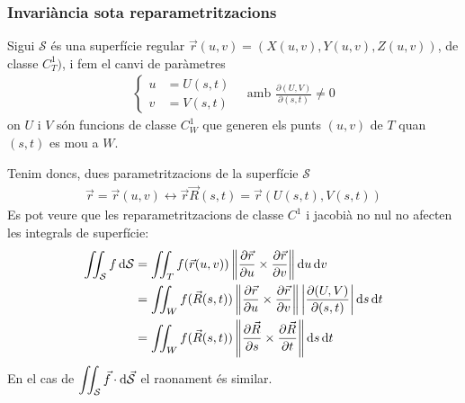 \subsubsection*{Invariància sota reparametritzacions}
Sigui $\mathcal{S}$ és una superfície regular $\vec{r}(u,v) = (X(u,v), Y(u,v), Z(u,v))$, de classe $C^{1}_{T})$, i fem el canvi de paràmetres
\begin{align*}
	\begin{cases} u & = U(s,t) \\ v & = V(s,t) \end{cases} \quad \text{amb } \frac{\partial (U,V)}{\partial (s,t)} \neq 0
\end{align*}
on $U$ i $V$ són funcions de classe $C^{1}_{W}$ que generen els punts $(u,v)$ de $T$ quan $(s,t)$ es mou a $W$.

Tenim doncs, dues parametritzacions de la superfície $\mathcal{S}$
\begin{align*}
	\vec{r} = \vec{r}(u,v) \leftrightarrow \vec{r} \vec{R}(s,t) = \vec{r}( U(s,t), V(s,t))
\end{align*}
Es pot veure que les reparametritzacions de classe $C^{1}$ i jacobià no nul no afecten les integrals de superfície:
\begin{align}
\begin{aligned}
	\iint_{\mathcal{S}} f \mathop{}\!\mathrm{d} \mathcal{S} & = \iint_{T} f(\vec{r}(u,v)) \left\| \frac{\partial \vec{r}}{\partial u} \times \frac{\partial \vec{r}}{\partial v} \right\| \mathop{}\!\mathrm{d} u \mathop{}\!\mathrm{d} v \\
	& = \iint_{W} f(\vec{R}(s,t)) \left\| \frac{\partial \vec{r}}{\partial u} \times \frac{\partial \vec{r}}{\partial v} \right\| \left| \frac{\partial (U,V)}{\partial (s,t)} \right| \mathop{}\!\mathrm{d} s \mathop{}\!\mathrm{d} t \\
	& = \iint_{W} f(\vec{R}(s,t)) \left\| \frac{\partial \vec{R}}{\partial s} \times \frac{\partial \vec{R}}{\partial t} \right\| \mathop{}\!\mathrm{d} s \mathop{}\!\mathrm{d} t
\end{aligned}
\end{align}
En el cas de $\displaystyle \iint_{\mathcal{S}} \vec{f} \cdot \mathrm{d} \vec{\mathcal{S}}$ el raonament és similar.
